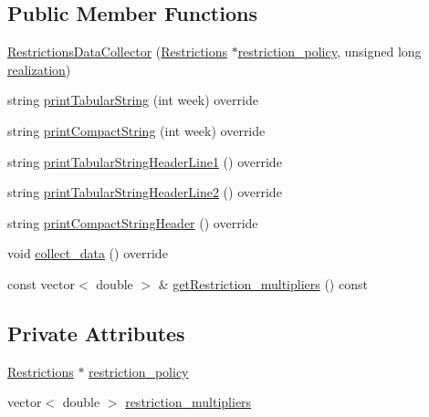 \subsection*{Public Member Functions}
\begin{DoxyCompactItemize}
\item 
\mbox{\hyperlink{classRestrictionsDataCollector_a0e700f013442a6df86fe75bcee4c31df_a0e700f013442a6df86fe75bcee4c31df}{Restrictions\+Data\+Collector}} (\mbox{\hyperlink{classRestrictions}{Restrictions}} $\ast$\mbox{\hyperlink{classRestrictionsDataCollector_a09e79e1e24fa4cc698c9dfa6914ee47d_a09e79e1e24fa4cc698c9dfa6914ee47d}{restriction\+\_\+policy}}, unsigned long \mbox{\hyperlink{classDataCollector_a9ef2887466fe3123aa19ef956a219b96_a9ef2887466fe3123aa19ef956a219b96}{realization}})
\item 
string \mbox{\hyperlink{classRestrictionsDataCollector_a45e5612e70ec98430e31271f68ca407e_a45e5612e70ec98430e31271f68ca407e}{print\+Tabular\+String}} (int week) override
\item 
string \mbox{\hyperlink{classRestrictionsDataCollector_ab8b8c30dca6b2e41c1ef5e3ac7e29813_ab8b8c30dca6b2e41c1ef5e3ac7e29813}{print\+Compact\+String}} (int week) override
\item 
string \mbox{\hyperlink{classRestrictionsDataCollector_a2676a6693b254997d223fc1c437258ab_a2676a6693b254997d223fc1c437258ab}{print\+Tabular\+String\+Header\+Line1}} () override
\item 
string \mbox{\hyperlink{classRestrictionsDataCollector_afb3c49c2c9b152bb2372e2fcc198e1b8_afb3c49c2c9b152bb2372e2fcc198e1b8}{print\+Tabular\+String\+Header\+Line2}} () override
\item 
string \mbox{\hyperlink{classRestrictionsDataCollector_ad36ff12a666d72c92893c918715628f6_ad36ff12a666d72c92893c918715628f6}{print\+Compact\+String\+Header}} () override
\item 
void \mbox{\hyperlink{classRestrictionsDataCollector_a7d8b6433ec25a53ed50577c2cf89912d_a7d8b6433ec25a53ed50577c2cf89912d}{collect\+\_\+data}} () override
\item 
const vector$<$ double $>$ \& \mbox{\hyperlink{classRestrictionsDataCollector_ac3f378d63c09a7c72d883db64ab610c9_ac3f378d63c09a7c72d883db64ab610c9}{get\+Restriction\+\_\+multipliers}} () const
\end{DoxyCompactItemize}
\subsection*{Private Attributes}
\begin{DoxyCompactItemize}
\item 
\mbox{\hyperlink{classRestrictions}{Restrictions}} $\ast$ \mbox{\hyperlink{classRestrictionsDataCollector_a09e79e1e24fa4cc698c9dfa6914ee47d_a09e79e1e24fa4cc698c9dfa6914ee47d}{restriction\+\_\+policy}}
\item 
vector$<$ double $>$ \mbox{\hyperlink{classRestrictionsDataCollector_afb6bc7f42a2490e2599c37baebe3995c_afb6bc7f42a2490e2599c37baebe3995c}{restriction\+\_\+multipliers}}
\end{DoxyCompactItemize}

